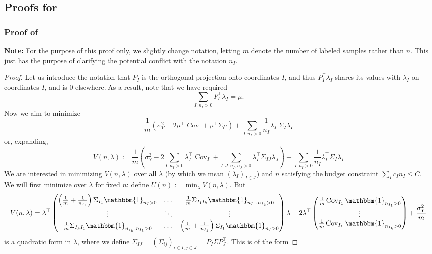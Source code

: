 \documentclass{article} %
\DeclareMathOperator{\Cov}{Cov}
\newcommand{\I}{\mathbbm{1}}
\begin{document}
\subsection{Proofs for }

\subsubsection{Proof of }
\textbf{Note:} For the purpose of this proof only, we slightly change notation, letting $m$ denote the number of labeled samples rather than $n$. This just has the purpose of clarifying the potential conflict with the notation $n_I$.

\begin{proof}
Let us introduce the notation that $P_I$ is the orthogonal projection onto coordinates $I$, and thus $P_I^\top \lambda_I$ shares its values with $\lambda_I$ on coordinates $I$, and is 0 elsewhere. As a result, note that we have required
\[
\sum_{I:n_I>0} P_I^\top \lambda_I = \mu.
\]
Now we aim to minimize
\[
\frac{1}{m}\left(\sigma^2_Y - 2\mu^\top \Cov + \mu^\top \Sigma\mu\right) + \sum_{I:n_I>0} \frac{1}{n_I} \lambda_I^\top\Sigma_I\lambda_I
\]
or, expanding,
\[
V(n,\lambda):=\frac{1}{m}\left(\sigma^2_Y - 2\sum_{I:n_I>0} \lambda_I^\top \Cov_I + \sum_{I,J:n_I,n_J>0}\lambda_I^\top \Sigma_{IJ}\lambda_J\right) + \sum_{I:n_I>0} \frac{1}{n_I} \lambda_I^\top\Sigma_I\lambda_I
\]
We are interested in minimizing $V(n,\lambda)$ over all $\lambda$ (by which we mean $(\lambda_I)_{I\in\mathcal{I}}$) and $n$ satisfying the budget constraint $\sum_I c_In_I\leq C$. We will first minimize over $\lambda$ for fixed $n$: define $U(n):=\min_\lambda V(n,\lambda)$. But
\[
V(n,\lambda) = \lambda^\top \begin{pmatrix}
    \left(\frac{1}{m}+\frac{1}{n_{I_1}}\right)\Sigma_{I_1}\I_{n_I>0} & \dots & \frac{1}{m}\Sigma_{I_1I_k}\I_{n_{I_1},n_{I_k}>0} \\
    \vdots & \ddots & \vdots\\
    \frac{1}{m}\Sigma_{I_kI_1}\I_{n_{I_k},n_{I_1}>0} & \dots & \left(\frac{1}{m}+\frac{1}{n_{I_1}}\right)\Sigma_{I_1}\I_{n_I>0}
\end{pmatrix}\lambda  -2 \lambda^\top\begin{pmatrix}
    \frac{1}{m}\Cov_{I_1}\I_{n_{I_1}>0} \\
    \vdots \\
    \frac{1}{m}\Cov_{I_k}\I_{n_{I_k}>0}
\end{pmatrix} +\frac{\sigma^2_Y}{m}
\]
is a quadratic form in $\lambda$, where we define $\Sigma_{IJ}=(\Sigma_{ij})_{i\in I, j\in J} = P_I\Sigma P_J^\top$. This is of the form

\end{proof}
\end{document}
